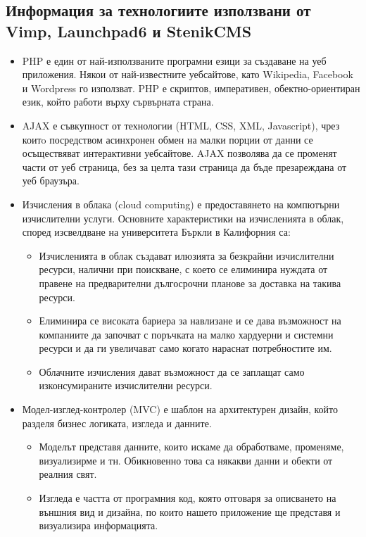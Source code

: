 \documentclass[pdftex,12pt,a4paper]{report}
\begin{document}
\subsection[Информация за използваните от тях технологии] {Информация за технологиите използвани от Vimp, Launchpad6 и StenikCMS}
\begin{itemize}
	\item PHP е един от най-използваните програмни езици за създаване на уеб приложения. Някои от най-известните уебсайтове, като Wikipedia, Facebook и Wordpress го използват. PHP е скриптов, императивен, обектно-ориентиран език, който работи върху сървърната страна.
	\item AJAX е съвкупност от технологии (HTML, CSS, XML, Javascript), чрез коитo посредством асинхронен обмен на малки порции от данни се осъществяват интерактивни уебсайтове. AJAX позволява да се променят части от уеб страница, без за целта тази страница да бъде презареждана от уеб браузъра.
	\item Изчисления в облака (cloud computing) е предоставянето на компютърни изчислителни услуги. Основните характеристики на изчисленията в облак, според изсвелдване на университета Бъркли в Калифорния са:
		\begin{itemize}
			\item Изчисленията в облак създават илюзията за безкрайни изчислителни ресурси, налични при поискване, с което се елиминира нуждата от правене на предварителни дългосрочни планове за доставка на такива ресурси.
			\item 	Елиминира се високата бариера за навлизане и се дава възможност на компаниите да започват с поръчката на малко хардуерни и системни ресурси и да ги увеличават само когато нараснат потребностите им.
			\item 	Облачните изчисления дават възможност да се заплащат само изконсумираните изчислителни ресурси.
		\end{itemize}
	\item Модел-изглед-контролер (MVC) е шаблон на архитектурен дизайн, който разделя бизнес логиката, изгледа и данните.
		\begin{itemize}
			\item Моделът представя данните, които искаме да обработваме, променяме, визуализирме и тн. Обикновенно това са някакви данни и обекти от реалния свят.
			\item Изгледа е частта от програмния код, която отговаря за описването на външния вид и дизайна, по които нашето приложение ще представя и визуализира информацията.

\end{itemize}
\end{itemize}
\end{document}
